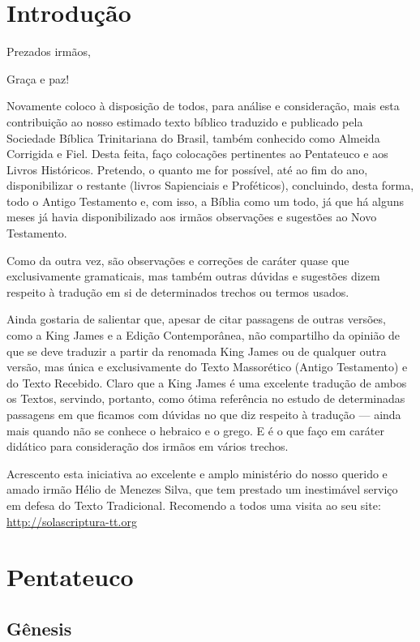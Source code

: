 \chapter{Introdução}

Prezados irmãos,

Graça e paz!

Novamente coloco à disposição de todos, para análise e consideração,
mais esta contribuição ao nosso estimado texto bíblico traduzido e
publicado pela Sociedade Bíblica Trinitariana do Brasil, também
conhecido como Almeida Corrigida e Fiel. Desta feita, faço colocações
pertinentes ao Pentateuco e aos Livros Históricos. Pretendo, o quanto
me for possível, até ao fim do ano, disponibilizar o restante (livros
Sapienciais e Proféticos), concluindo, desta forma, todo o Antigo
Testamento e, com isso, a Bíblia como um todo, já que há alguns meses
já havia disponibilizado aos irmãos observações e sugestões ao Novo
Testamento.

Como da outra vez, são observações e correções de caráter
quase que exclusivamente gramaticais, mas também outras dúvidas e
sugestões dizem respeito à tradução em si de determinados trechos ou
termos usados.

Ainda gostaria de salientar que, apesar de citar passagens de outras
versões, como a King James e a Edição Contemporânea, não compartilho
da opinião de que se deve traduzir a partir da renomada King James ou de
qualquer outra versão, mas única e exclusivamente do Texto Massorético
(Antigo Testamento) e do Texto Recebido. Claro que a King James é uma
excelente tradução de ambos os Textos, servindo, portanto, como ótima
referência no estudo de determinadas passagens em que ficamos com
dúvidas no que diz respeito à tradução --- ainda mais quando não se
conhece o hebraico e o grego. E é o que faço em caráter didático para
consideração dos irmãos em vários trechos.

Acrescento esta iniciativa ao excelente e amplo ministério do
nosso querido e amado irmão Hélio de Menezes Silva, que tem prestado
um inestimável serviço em defesa do Texto Tradicional. Recomendo a todos
uma visita ao seu site: \url{http://solascriptura-tt.org}

\chapter{Pentateuco}

\section{Gênesis}
